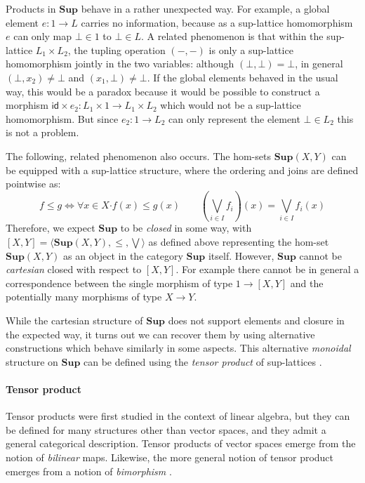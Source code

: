 \documentclass[11pt,oneside]{book}
\theoremstyle{definition}
\newcommand{\kw}[1]{\ensuremath{ \mathsf{#1} }}
\newcommand{\bdot}{\boldsymbol{\cdot}}
\begin{document}
Products in $\mathbf{Sup}$
behave in a rather unexpected way.
For example,
a global element $e : 1 \rightarrow L$
carries no information,
because as a sup-lattice homomorphism $e$
can only map $\bot \in 1$ to $\bot \in L$.
A related phenomenon is that
within the sup-lattice $L_1 \times L_2$,
the tupling operation $(-, -)$
is only a sup-lattice homomorphism
jointly in the two variables:
although $(\bot, \bot) = \bot$,
in general $(\bot, x_2) \ne \bot$ and $(x_1, \bot) \ne \bot$.
If the global elements behaved in the usual way,
this would be a paradox because
it would be possible to construct a morphism
$\kw{id} \times e_2 : L_1 \times 1 \rightarrow L_1 \times L_2$
which would not be a sup-lattice homomorphism.
But since $e_2 : 1 \rightarrow L_2$
can only represent the element $\bot \in L_2$
this is not a problem.

The following, related phenomenon also occurs.
The hom-sets $\mathbf{Sup}(X, Y)$
can be equipped with a sup-lattice structure,
where the ordering and joins are defined pointwise as:
\[
  f \le g \Leftrightarrow \forall x \in X \bdot f(x) \le g(x)
  \qquad
  \left( \bigvee_{i \in I} f_i \right)(x) = \bigvee_{i \in I} f_i(x)
\]
Therefore,
we expect $\mathbf{Sup}$
to be \emph{closed} in some way, with
$[X, Y] = \langle \mathbf{Sup}(X, Y), {\le}, {\bigvee} \rangle$
as defined above representing the hom-set
$\mathbf{Sup}(X, Y)$ as an object in the category $\mathbf{Sup}$ itself.
However,
$\mathbf{Sup}$ cannot be \emph{cartesian} closed
with respect to $[X, Y]$.
For example there cannot be in general
a correspondence between the single morphism of type
$1 \rightarrow [X, Y]$
and the potentially many morphisms of type
$X \rightarrow Y$.


While the cartesian structure of $\mathbf{Sup}$
does not support elements and closure in the
expected way,
it turns out we can recover them by using alternative constructions
which behave similarly in some aspects.
This alternative \emph{monoidal} structure on $\mathbf{Sup}$
can be defined using the \emph{tensor product}
of sup-lattices \citep[Chapter I]{egg}.

\paragraph{Tensor product} %

Tensor products were first studied in the context of linear algebra,
but they can be defined for many structures other than vector spaces,
and they admit a general categorical description.
Tensor products of vector spaces
emerge from the notion of \emph{bilinear} maps.
Likewise,
the more general notion of tensor product
emerges from a notion of \emph{bimorphism} \citep{tpbm}.
\end{document}
